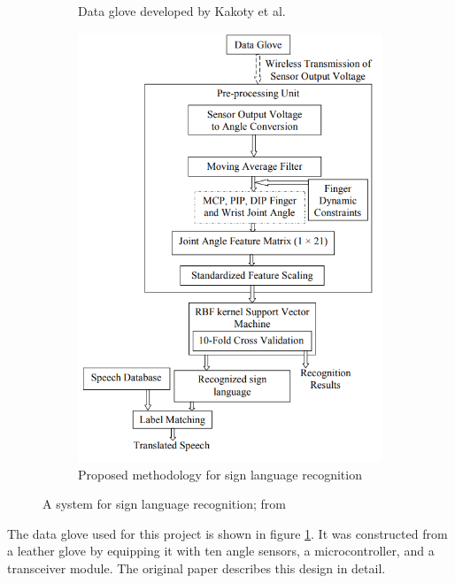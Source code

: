 \documentclass[hyperref, bachelorofscience]{cgvpub}
\begin{document}
\begin{figure}[b!]
\begin{subfigure}{.347\linewidth}
		\caption{Data glove developed by Kakoty et al.}
		\label{fig:kakoty_glove}
	\end{subfigure}
	\hspace{1cm}
	\begin{subfigure}{.4\linewidth}
		\includegraphics[width=\linewidth]{../pics/kakoty_principle}
		\caption{Proposed methodology for sign language recognition}
		\label{fig:kakoty_principle}
	\end{subfigure}
	\caption[A system for sign language recognition]{A system for sign language recognition; from \cite{kakoty18}}
	\label{fig:kakoty}
\end{figure}

The data glove used for this project is shown in figure \ref{fig:kakoty_glove}. It was constructed from a leather glove by equipping it with ten angle sensors, a microcontroller, and a transceiver module. The original paper describes this design in detail.
\end{document}
